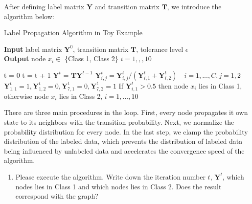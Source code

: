 \documentclass{article}
\begin{document}
After defining label matrix $\boldsymbol{Y}$ and transition matrix $\boldsymbol{T}$, we introduce the algorithm below: \\

\begin{algorithm}
  \caption{Label Propagation Algorithm in Toy Example}
  \label{alg:label_propagation_algorithm_in_toy_example}
  \hspace*{\algorithmicindent} \textbf{Input}  label matrix $\boldsymbol{Y}^0$, transition matrix $\boldsymbol{T}$, tolerance level $\epsilon$ \\
  \hspace*{\algorithmicindent} \textbf{Output} node $x_i \in $ \{Class 1, Class 2\} \quad $i=1,,,10$
  \begin{algorithmic}[1]
    \State t = 0
    \Repeat
        \State t = t + 1
        \State $\boldsymbol{Y}^{t}$ = $\boldsymbol{T} \boldsymbol{Y}^{t-1}$ 
        \State $\boldsymbol{Y}^{t}_{i,j} = \boldsymbol{Y}^{t}_{i,j} / (\boldsymbol{Y}^{t}_{i,1} + \boldsymbol{Y}^{t}_{i,2}) \quad i=1,...,C, j = 1, 2$ 
        \State $\boldsymbol{Y}^{t}_{1,1} = 1, \boldsymbol{Y}^{t}_{1,2} = 0,\boldsymbol{Y}^{t}_{7,1} = 0,\boldsymbol{Y}^{t}_{7,2} = 1$ 
    \State If $\boldsymbol{Y}^{t}_{i,1} > 0.5$ then node $x_i$ lies in Class 1, otherwise node $x_i$ lies in Class 2, \quad $i=1,...,10$
    \EndProcedure
   \end{algorithmic}
\end{algorithm}

\newpage
There are three main procedures in the loop. First, every node propagates it own state to its neighbors with the transition probability. Next, we normalize the probability distribution for every node. In the last step, we clamp the probability distribution of the labeled data, which prevents the distribution of labeled data being influenced by unlabeled data and accelerates the convergence speed of the algorithm.
\begin{enumerate}[resume]
\item Please execute the algorithm. Write down the iteration number $t$, $\boldsymbol{Y}^{t}$, which nodes lies in Class 1 and which nodes lies in Class 2. Does the result correspond with the graph?
\end{enumerate}
\end{document}
